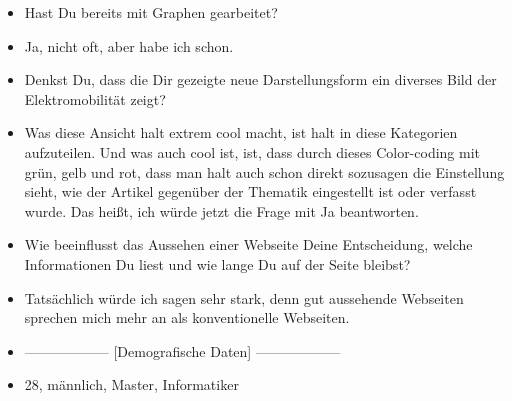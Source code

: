 {\begin{itemize}[]
        Aber ansonsten finde ich das ziemlich cool, dass man halt über diese Graphen recht schnell zu irgendwelchen Artikeln kommt.
        Ja, und wenn die Knoten, die noch keine Betitelung hatten, wenn die sozusagen auch noch eine Betitelung bekommen würden, dann wäre die Navigation durch diesen ganzen Graphen noch intuitiver und einfacher.
        \item {} Hast Du bereits mit Graphen gearbeitet?
        \item {} Ja, nicht oft, aber habe ich schon.
        \item {} Denkst Du, dass die Dir gezeigte neue Darstellungsform ein diverses Bild der Elektromobilität zeigt?
        \item {} Was diese Ansicht halt extrem cool macht, ist halt in diese Kategorien aufzuteilen.
        Und was auch cool ist, ist, dass durch dieses Color-coding mit grün, gelb und rot, dass man halt auch schon direkt sozusagen die Einstellung sieht, wie der Artikel gegenüber der Thematik eingestellt ist oder verfasst wurde. 
        Das heißt, ich würde jetzt die Frage mit Ja beantworten.
        \item {} Wie beeinflusst das Aussehen einer Webseite Deine Entscheidung, welche Informationen Du liest und wie lange Du auf der Seite bleibst?
        \item {} Tatsächlich würde ich sagen sehr stark, denn gut aussehende Webseiten sprechen mich mehr an als konventionelle Webseiten.
        \item {------------------} [Demografische Daten] {------------------}
        \item {} 28, männlich, Master, Informatiker
    \end{itemize}}
\nolinenumbers
